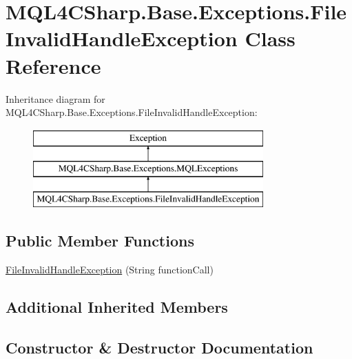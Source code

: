 \hypertarget{class_m_q_l4_c_sharp_1_1_base_1_1_exceptions_1_1_file_invalid_handle_exception}{}\section{M\+Q\+L4\+C\+Sharp.\+Base.\+Exceptions.\+File\+Invalid\+Handle\+Exception Class Reference}
\label{class_m_q_l4_c_sharp_1_1_base_1_1_exceptions_1_1_file_invalid_handle_exception}
Inheritance diagram for M\+Q\+L4\+C\+Sharp.\+Base.\+Exceptions.\+File\+Invalid\+Handle\+Exception\+:\begin{figure}[H]
\begin{center}
\leavevmode
\includegraphics[height=3.000000cm]{class_m_q_l4_c_sharp_1_1_base_1_1_exceptions_1_1_file_invalid_handle_exception}
\end{center}
\end{figure}
\subsection*{Public Member Functions}
\begin{DoxyCompactItemize}
\item 
\hyperlink{class_m_q_l4_c_sharp_1_1_base_1_1_exceptions_1_1_file_invalid_handle_exception_ab289157e6d7557fb0e5655ca9151e190}{File\+Invalid\+Handle\+Exception} (String function\+Call)
\end{DoxyCompactItemize}
\subsection*{Additional Inherited Members}


\subsection{Constructor \& Destructor Documentation}
